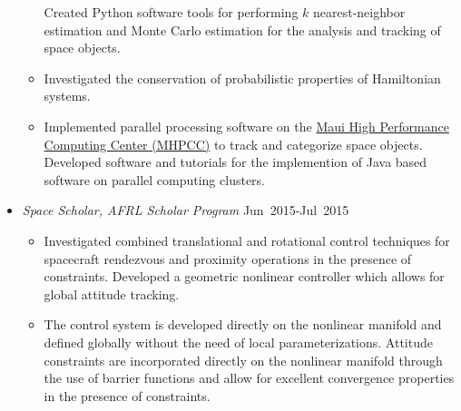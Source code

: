 \begin{itemize}
\begin{itemize}
            Created Python software tools for performing \(k\) nearest-neighbor estimation and Monte Carlo estimation for the analysis and tracking of space objects.
            \item Investigated the conservation of probabilistic properties of Hamiltonian systems.
            \item Implemented parallel processing software on the \href{https://www.mhpcc.hpc.mil/}{Maui High Performance Computing Center (MHPCC)} to track and categorize space objects.
            Developed software and tutorials for the implemention of Java based software on parallel computing clusters.
        \end{itemize}
        \item[] \textit{Space Scholar, AFRL Scholar Program} \hfill {Jun~2015-Jul~2015}
        \begin{itemize}
            \item Investigated combined translational and rotational control techniques for spacecraft rendezvous and proximity operations in the presence of constraints.
            Developed a geometric nonlinear controller which allows for global attitude tracking.
            \item The control system is developed directly on the nonlinear manifold and defined globally without the need of local parameterizations.
            Attitude constraints are incorporated directly on the nonlinear manifold through the use of barrier functions and allow for excellent convergence properties in the presence of constraints. 
        \end{itemize}
    \end{itemize}
    


